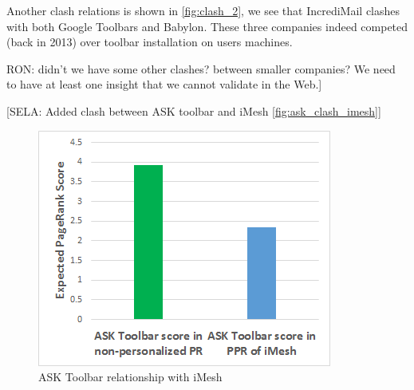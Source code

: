 \documentclass[11pt,oneside]{book}
\begin{document}
Another clash relations is shown in \autoref{fig:clash_2}, we see that IncrediMail clashes with both Google Toolbars and Babylon. These three companies indeed competed (back in 2013) over toolbar installation on users machines. {RON: didn't we have some other clashes? between smaller companies? We need to have at least one insight that we cannot validate in the Web.]

[SELA: Added clash between ASK toolbar and iMesh \autoref{fig:ask_clash_imesh}]

\begin{figure}[!htbp]
\centering
\includegraphics[width=\linewidth]{figures/ask_clash_imesh.png}
\caption{ASK Toolbar relationship with iMesh}
\label{fig:ask_clash_imesh}
\end{figure}

}
\end{document}
